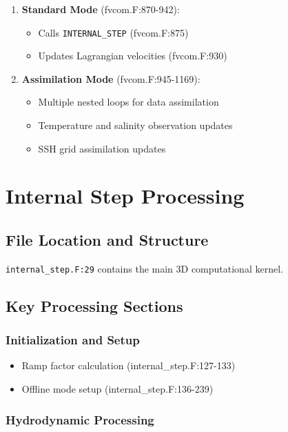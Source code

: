 \documentclass[12pt,a4paper]{article}
\begin{document}
\begin{enumerate}
    \item \textbf{Standard Mode} (fvcom.F:870-942):
        \begin{itemize}
            \item Calls \texttt{INTERNAL\_STEP} (fvcom.F:875)
            \item Updates Lagrangian velocities (fvcom.F:930)
        \end{itemize}

    \item \textbf{Assimilation Mode} (fvcom.F:945-1169):
        \begin{itemize}
            \item Multiple nested loops for data assimilation
            \item Temperature and salinity observation updates
            \item SSH grid assimilation updates
        \end{itemize}
\end{enumerate}

\section{Internal Step Processing}

\subsection{File Location and Structure}
\texttt{internal\_step.F:29} contains the main 3D computational kernel.

\subsection{Key Processing Sections}

\subsubsection{Initialization and Setup}
\begin{itemize}
    \item Ramp factor calculation (internal\_step.F:127-133)
    \item Offline mode setup (internal\_step.F:136-239)
\end{itemize}

\subsubsection{Hydrodynamic Processing}
\end{document}
